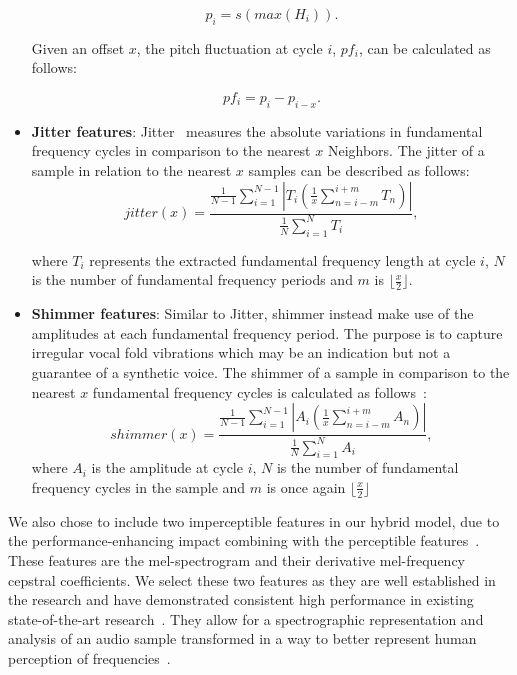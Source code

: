 \documentclass{article}
\begin{document}
\begin{itemize}
\begin{equation}
    p_{i} = s(max(H_{i})).
\end{equation}

Given an offset \(x\), the pitch fluctuation at cycle \(i\), \(pf_{i}\), can be calculated as follows:

\begin{equation}
    pf_{i} = p_{i}-p_{i-x}.
\end{equation}
   
\item \textbf{Jitter features}: Jitter~\cite{chaiwongyen_deepfake-speech_2023} measures the absolute variations in fundamental frequency cycles in comparison to the nearest \(x\) Neighbors. The jitter of a sample in relation to the nearest \(x\) samples can be described as follows:
\begin{equation}
    jitter(x) = \frac{ \frac{1}{N-1}\sum_{i=1}^{N-1}|T_{i}
						(\frac{1}{x}\sum_{n=i-m}^{i+m}T_{n})|}
					{\frac{1}{N}\sum_{i=1}^{N}T_{i}}, 
\end{equation}
					
where \(T_{i}\) represents the extracted fundamental frequency length at cycle \(i\), \(N\) is the number of fundamental frequency periods and \(m\) is \(\lfloor \frac{x}{2} \rfloor\).

\item \textbf{Shimmer features}: Similar to Jitter, shimmer instead make use of the amplitudes at each fundamental frequency period. The purpose is to capture irregular vocal fold vibrations which may be an indication but not a guarantee of a synthetic voice. The shimmer of a sample in comparison to the nearest \(x\) fundamental frequency cycles is calculated as follows~\cite{chaiwongyen_deepfake-speech_2023}:
\begin{equation}
    shimmer(x) = \frac{ \frac{1}{N-1}\sum_{i=1}^{N-1}|A_{i}
						(\frac{1}{x}\sum_{n=i-m}^{i+m}A_{n})|}
					{\frac{1}{N}\sum_{i=1}^{N}A_{i}},
\end{equation}
where \(A_{i}\) is the amplitude at cycle \(i\), \(N\) is the number of fundamental frequency cycles in the sample and \(m\) is once again \(\lfloor \frac{x}{2} \rfloor\)
			
\end{itemize}


We also chose to include two imperceptible features in our hybrid model, due to the performance-enhancing impact combining with the perceptible features~\cite{chaiwongyen_deepfake-speech_2023}. These features are the mel-spectrogram and their derivative mel-frequency cepstral coefficients. We select these two features as they are well established in the research and have demonstrated consistent high performance in existing state-of-the-art research~\cite{qais_deepfake_2022,anagha_audio_2023,fathan_mel-spectrogram_2022,altalahin_unmasking_2023,hamza_deepfake_2022,yan_initial_2022}. They allow for a	spectrographic representation and analysis of an audio sample transformed in a way to better represent human perception of frequencies~\cite{qais_deepfake_2022}.
\end{document}
